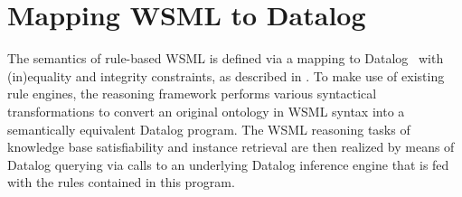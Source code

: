 \newcommand{\smtxtit}[1]{\ensuremath{\textit{\scriptsize{#1}}}}
\newcommand{\trans}[1]{\ensuremath{\tau_{#1}}\xspace}
\newcommand{\transtxt}[1]{\trans{\smtxtit{#1}}}
\def\transax{\transtxt{axioms}}
\def\transnorm{\transtxt{norm}}
\def\translt{\transtxt{lt}}
\def\transdlog{\transtxt{datalog}}

\def\LE{\ensuremath{\mathcal{L\!E}}\xspace}
\def\O{\ensuremath{\mathcal{O}}\xspace}
\def\P{\ensuremath{\mathcal{P}}\xspace}
\newcommand{\powset}[1]{\ensuremath{2^{#1}}\xspace}
\def\lprl{\ensuremath{\;:\!-\:}}
\def\cstr{\ensuremath{\;!-\:}}
\def\qury{\ensuremath{\;?-\:}}
\def\dlogrule{\lprl}
\def\dlogcstr{\square\lprl}
\def\dlogand{\wedge}
\def\dlognot{\sim}
\newcommand{\dlogfact}[1]{\ensuremath{{#1}\;.}}

\newcommand{\predicate}[1]{\ensuremath{p_{#1}}\xspace}
\newcommand{\predsubtxt}[1]{\mathrm{\sf #1}}
\def\psco{\predicate{\predsubtxt{sco}}}
\def\pmo{\predicate{\predsubtxt{mo}}}
\def\phval{\predicate{\predsubtxt{hval}}}
\def\pitype{\predicate{\predsubtxt{itype}}}
\def\potype{\predicate{\predsubtxt{otype}}}
\def\mlaxioms{\ensuremath{P_{\smtxtit{meta}}}\xspace}

\newcommand{\typeof}{\ensuremath{\textit{typeOf}}\xspace}

\def\bla{\textbf{{\sf bla}}\xspace}

\section{Mapping WSML to Datalog\label{sec:mapping}}

The semantics of rule-based WSML is defined via a mapping to
Datalog~\cite{datalog} with (in)equality and integrity
constraints, as described in \cite{wsml-spec}. To make use of
existing rule engines, the reasoning framework performs various
syntactical transformations to convert an original ontology in
WSML syntax into a semantically equivalent Datalog program. The
WSML reasoning tasks of knowledge base satisfiability and instance
retrieval are then realized by means of Datalog querying via calls
to an underlying Datalog inference engine that is fed with the
rules contained in this program.





